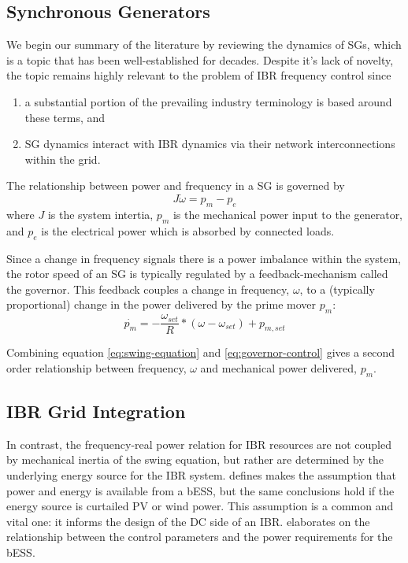 \documentclass[journal]{IEEEtran}
\begin{document}
\subsection{Synchronous Generators}
 We begin our summary of the literature by reviewing the dynamics of SGs, 
 which is a topic that has been well-established
 for decades. Despite it's lack of novelty, the topic remains highly
 relevant to the problem of IBR frequency control since
 \begin{enumerate}
  \item a substantial portion of the prevailing industry terminology
    is based around these terms, and
  \item SG dynamics interact with IBR dynamics via their network
    interconnections within the grid.
 \end{enumerate}


 The relationship between power and frequency in a SG is governed by
 \begin{equation}
  J\dot{\omega} = p_m - p_e
  \label{eq:swing-equation}
 \end{equation}
 where $J$ is the system intertia, $p_m$ is the mechanical power input to
 the generator, and $p_e$ is the electrical power which is absorbed
 by connected loads.

Since a change in frequency signals there is a power imbalance within the
system, the rotor speed of an SG is typically regulated by a
feedback-mechanism called the governor. This feedback couples a change in 
frequency, $\omega$, to a (typically proportional) change in the power
delivered by the prime mover $p_m$:
\begin{equation}
  \dot{p_m} = - \frac{\omega_{set}}{R} * (\omega - \omega_{set}) + p_{m,set}
  \label{eq:governor-control}
\end{equation}

Combining equation \ref{eq:swing-equation} and \ref{eq:governor-control}
gives a second order relationship between frequency, $\omega$ and 
mechanical power delivered, $p_m$.
 
\subsection{IBR Grid Integration}
In contrast, the frequency-real power relation for IBR resources are not
coupled by mechanical inertia of the swing equation,
but rather are determined by the underlying energy source for the IBR system.
defines makes the assumption that power and energy is available from a bESS,
but the same conclusions hold if the energy source is curtailed PV or wind power.
This assumption is a common and vital one: it informs the design of
the DC side of an IBR. %
elaborates on the relationship between the control parameters and
the power requirements for the bESS.
\end{document}
